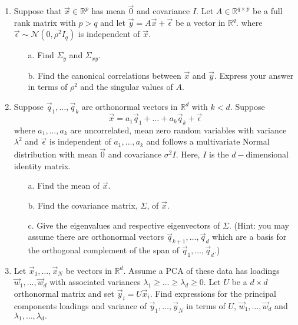 \documentclass[12 point]{article}
\begin{document}
\begin{enumerate}
\item Suppose that $\vec{x}\in \mathbb{R}^p$ has mean $\vec{0}$ and covariance $I$.  Let $A \in \mathbb{R}^{q\times p}$ be a full rank matrix with $p > q$ and let  $\vec{y} = A\vec{x} + \vec{\epsilon}$ be a vector in $\mathbb{R}^q.$ where $\vec{\epsilon} \sim \mathcal{N}(0,\rho^2 I_q)$ is independent of $\vec{x}.$
\begin{itemize}
\item[a.] Find $\Sigma_y$ and $\Sigma_{xy}.$
    \vspace{8 cm}
\item[b.]  Find the canonical correlations between $\vec{x}$ and $\vec{y}.$ Express your answer in terms of $\rho^2$ and the singular values of $A$.
\end{itemize}
    
\newpage

\item Suppose $\vec{q}_1,\dots,\vec{q}_k$ are orthonormal vectors in $\mathbb{R}^d$ with $k < d.$  Suppose $$\vec{x} = a_1\vec{q}_1+\dots + a_k \vec{q}_k + \vec{\epsilon}$$
where $a_1,\dots,a_k$ are uncorrelated, mean zero random variables with variance $\lambda^2$ and $\vec{\epsilon}$ is independent of $a_1,\dots,a_k$ and follows a multivariate Normal distribution with mean $\vec{0}$ and covariance $\sigma^2 I$. Here, $I$ is the $d-$dimensional identity matrix.
\begin{itemize}
\item[a.] Find the mean of $\vec{x}$.
\vspace{3cm}
 \item[b.] Find the covariance matrix, $\Sigma$, of $\vec{x}$.
\vspace{5cm}
\item[c.] Give the eigenvalues and respective eigenvectors of $\Sigma.$  (Hint: you may assume there are orthonormal vectors $\vec{q}_{k+1},\dots,\vec{q}_d$ which are a basis for the orthogonal complement of the span of $\vec{q}_1,\dots,\vec{q}_d.$)
\end{itemize}
\newpage
\item Let $\vec{x}_1,\dots,\vec{x}_N$ be vectors in $\mathbb{R}^d$. Assume a PCA of these data has loadings $\vec{w}_1,\dots,\vec{w}_d$ with associated variances $\lambda_1 \ge \dots \ge \lambda_d \ge 0.$ Let $U$ be a $d\times d$ orthonormal matrix and set $\vec{y}_i = U\vec{x}_i.$ Find expressions for the principal components loadings and variance of $\vec{y}_1,\dots,\vec{y}_N$ in terms of $U$, $\vec{w}_1,\dots,\vec{w}_d$ and $\lambda_1,\dots,\lambda_d.$



\end{enumerate}
\end{document}
